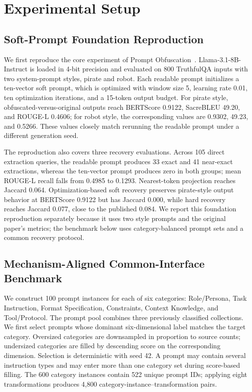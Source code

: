 \documentclass[letterpaper]{article} %
\begin{document}
\section{Experimental Setup}

\subsection{Soft-Prompt Foundation Reproduction}

We first reproduce the core experiment of Prompt Obfuscation~\citep{pape2025promptobfuscation}.  Llama-3.1-8B-Instruct is loaded in 4-bit precision and evaluated on 800 TruthfulQA inputs with two system-prompt styles, pirate and robot.  Each readable prompt initializes a ten-vector soft prompt, which is optimized with window size 5, learning rate 0.01, ten optimization iterations, and a 15-token output budget.  For pirate style, obfuscated-versus-original outputs reach BERTScore 0.9122, SacreBLEU 49.20, and ROUGE-L 0.4606; for robot style, the corresponding values are 0.9302, 49.23, and 0.5266.  These values closely match rerunning the readable prompt under a different generation seed.

The reproduction also covers three recovery evaluations.  Across 105 direct extraction queries, the readable prompt produces 33 exact and 41 near-exact extractions, whereas the ten-vector prompt produces zero in both groups; mean ROUGE-L recall falls from 0.4985 to 0.1293.  Nearest-token projection reaches Jaccard 0.064.  Optimization-based soft recovery preserves pirate-style output behavior at BERTScore 0.9122 but has Jaccard 0.000, while hard recovery reaches Jaccard 0.077, close to the published 0.084.  We report this foundation reproduction separately because it uses two style prompts and the original paper's metrics; the benchmark below uses category-balanced prompt sets and a common recovery protocol.

\subsection{Mechanism-Aligned Common-Interface Benchmark}

We construct 100 prompt instances for each of six categories: Role/Persona, Task Instruction, Format Specification, Constraints, Context Knowledge, and Tool/Protocol.  The prompt pool combines three previously classified collections.  We first select prompts whose dominant six-dimensional label matches the target category.  Oversized categories are downsampled in proportion to source counts; undersized categories are filled by descending score on the corresponding dimension.  Selection is deterministic with seed 42.  A prompt may contain several instruction types and may enter more than one category set during score-based filling.  The 600 category instances contain 522 unique prompt IDs; applying eight transformations produces 4,800 category-instance--transformation pairs.
\end{document}
